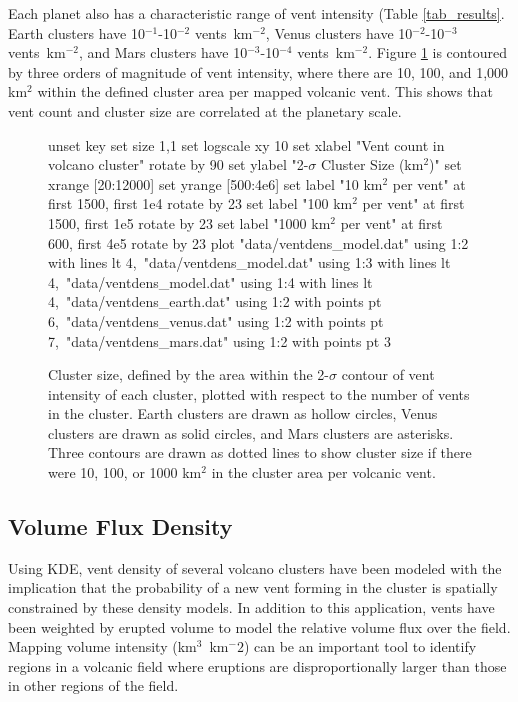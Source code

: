 Each planet also has a characteristic range of vent intensity (Table \ref{tab_results}. Earth clusters have 10$^{-1}$-10$^{-2}$ vents~km$^{-2}$, Venus clusters have 10$^{-2}$-10$^{-3}$ vents~km$^{-2}$, and Mars clusters have 10$^{-3}$-10$^{-4}$ vents~km$^{-2}$. Figure \ref{fig_ventdens} is contoured by three orders of magnitude of vent intensity, where there are 10, 100, and 1,000 km$^2$ within the defined cluster area per mapped volcanic vent. This shows that vent count and cluster size are correlated at the planetary scale.

\begin{figure}[h!]
	\centering
	\begin{gnuplot}[terminal=latex, terminaloptions=rotate]
		unset key
		set size 1,1
		set logscale xy 10
		set xlabel "Vent count in volcano cluster" rotate by 90
		set ylabel "2-$\sigma$ Cluster Size (km$^2$)"
		set xrange [20:12000]
		set yrange [500:4e6]
		set label "10 km$^2$ per vent" at first 1500, first 1e4 rotate by 23
		set label "100 km$^2$ per vent" at first 1500, first 1e5 rotate by 23
		set label "1000 km$^2$ per vent" at first 600, first 4e5 rotate by 23
		plot "data/ventdens_model.dat" using 1:2 with lines lt 4,\
		"data/ventdens_model.dat" using 1:3 with lines lt 4,\
		"data/ventdens_model.dat" using 1:4 with lines lt 4,\
		"data/ventdens_earth.dat" using 1:2 with points pt 6,\
		"data/ventdens_venus.dat" using 1:2 with points pt 7,\
		"data/ventdens_mars.dat" using 1:2 with points pt 3
	\end{gnuplot}
	\caption[Cluster size, defined by the area within the 2-$\sigma$ contour of vent intensity of each cluster, plotted with respect to the number of vents in the cluster]{Cluster size, defined by the area within the 2-$\sigma$ contour of vent intensity of each cluster, plotted with respect to the number of vents in the cluster. Earth clusters are drawn as hollow circles, Venus clusters are drawn as solid circles, and Mars clusters are asterisks. Three contours are drawn as dotted lines to show cluster size if there were 10, 100, or 1000 km$^2$ in the cluster area per volcanic vent.}
	\label{fig_ventdens}
\end{figure}
	

\subsection{Volume Flux Density}
Using KDE, vent density of several volcano clusters have been modeled with the implication that the probability of a new vent forming in the cluster is spatially constrained by these density models. In addition to this application, vents have been weighted by erupted volume to model the relative volume flux over the field. Mapping volume intensity (km$^3$~km$^-2$) can be an important tool to identify regions in a volcanic field where eruptions are disproportionally larger than those in other regions of the field.

